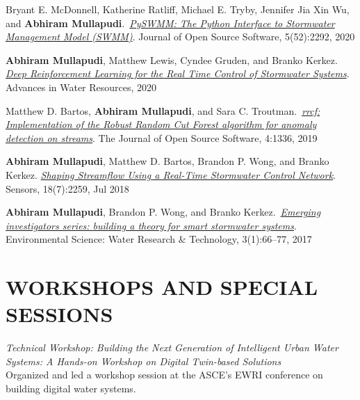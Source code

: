 \documentclass[a4paper,11pt]{article}
\newcommand{\years}[1]{%
  {\reversemarginpar\strut\marginnote{{\small#1}}}%
}
\begin{document}
\years{2020}  Bryant E. McDonnell, Katherine Ratliff, Michael E. Tryby, Jennifer Jia Xin Wu,
and \textbf{Abhiram Mullapudi}.\ \href{https://joss.theoj.org/papers/10.21105/joss.02292.pdf}{\emph{PySWMM: The Python Interface to Stormwater Management Model (SWMM)}}. Journal of Open Source Software, 5(52):2292, 2020\\[.1cm]


\years{2020}  \textbf{Abhiram Mullapudi}, Matthew Lewis, Cyndee Gruden, and Branko Kerkez.
\href{http://www.sciencedirect.com/science/article/pii/S0309170820302499}{\emph{Deep Reinforcement Learning for the Real Time Control of Stormwater Systems}}. Advances in Water Resources, 2020\\[.1cm]


\years{2019} Matthew D. Bartos, \textbf{Abhiram Mullapudi}, and Sara C. Troutman.\ \href{https://joss.theoj.org/papers/10.21105/joss.01336}{\emph{rrcf: Implementation of the Robust Random Cut Forest algorithm for anomaly detection on streams}}. The Journal of Open Source Software, 4:1336, 2019\\[.1cm]


\years{2018} \textbf{Abhiram Mullapudi}, Matthew D. Bartos, Brandon P. Wong, and Branko Kerkez.
\href{https://randomstorms.net/data/papers/shapingwater.pdf}{\emph{Shaping Streamflow Using a Real-Time Stormwater Control Network}}. Sensors, 18(7):2259, Jul 2018\\[.1cm]


\years{2017} \textbf{Abhiram Mullapudi}, Brandon P. Wong, and Branko Kerkez.\ \href{https://randomstorms.net/data/papers/stormwatertheory.pdf}{\emph{Emerging investigators series: building a theory for smart stormwater systems}}. Environmental Science: Water Research \& Technology, 3(1):66–77, 2017


\section*{WORKSHOPS AND SPECIAL SESSIONS}

\years{2023} \emph{Technical Workshop: Building the Next Generation of Intelligent Urban Water
Systems: A Hands-on Workshop on Digital Twin-based Solutions}\\[.05cm]

Organized and led a workshop session at the ASCE’s EWRI conference on building
digital water systems.
\end{document}
